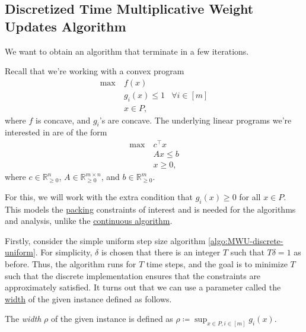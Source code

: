 \subsection{Discretized Time Multiplicative Weight Updates Algorithm}
We want to obtain an algorithm that terminate in a few iterations.

\begin{prev}
	Recall that we're working with a convex program
	\[
		\begin{aligned}
			\max~ & f(x)                              \\
			      & g_i(x) \leq 1 & \forall i \in [m] \\
			      & x \in P,
		\end{aligned}
	\]
	where \(f\) is concave, and \(g_i\)'s are concave. The underlying linear programs we're interested in are of the form
	\[
		\begin{aligned}
			\max~ & c^{\top} x \\
			      & Ax \leq b  \\
			      & x \geq 0,
		\end{aligned}
	\]
	where \(c \in \mathbb{R} _{\geq 0}^n\), \(A \in \mathbb{R} _{\geq 0}^{m \times n}\), and \(b \in \mathbb{R} _{\geq 0}^m\).
\end{prev}

For this, we will work with the extra condition that \(g_i(x) \geq 0\) for all \(x \in P\). This models the \hyperref[def:packing-LP]{packing} constraints of interest and is needed for the algorithms and analysis, unlike the \hyperref[algo:MWU-continuous]{continuous algorithm}.

Firstly, consider the simple uniform step size algorithm \autoref{algo:MWU-discrete-uniform}. For simplicity, \(\delta \) is chosen that there is an integer \(T\) such that \(T \delta = 1\) as before. Thus, the algorithm runs for \(T\) time steps, and the goal is to minimize \(T\) such that the discrete implementation ensures that the constraints are approximately satisfied. It turns out that we can use a parameter called the \hyperref[def:width]{width} of the given instance defined as follows.

\begin{definition}[Width]\label{def:width}
	The \emph{width} \(\rho \) of the given instance is defined as \(\rho \coloneqq \sup _{x \in P, i \in [m]} g_i(x)\).
\end{definition}

